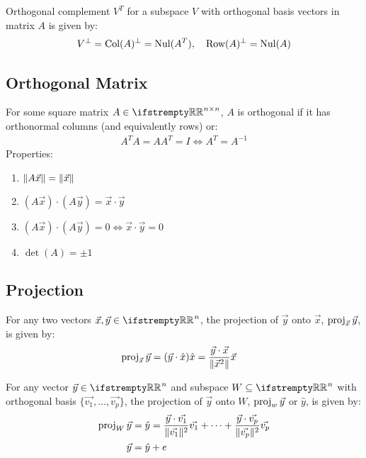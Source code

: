 \documentclass[12pt, a4paper]{article}
\begin{document}
\begin{multicols*}{3}
Orthogonal complement $V^T$ for a subspace $V$ with orthogonal basis vectors in matrix $A$ is given by:
\begin{align*}
  V^{\perp} = \operatorname{Col}(A)^{\perp} = \operatorname{Nul}(A^T),\quad \operatorname{Row}(A)^{\perp} = \operatorname{Nul}(A)
\end{align*}

\subsection{Orthogonal Matrix}
For some square matrix $A \in \RR^{n{\times}n}$, $A$ is orthogonal if it has orthonormal columns (and equivalently rows) or:
\begin{align*}
  A^TA = AA^T = I \iff A^T = A^{-1}
\end{align*}
Properties:
\begin{enumerate}[\roman*.]
  \item $\lVert A\vec{x}\rVert = \lVert\vec{x}\rVert$
  \item $(A\vec{x})\cdot(A\vec{y}) = \vec{x}\cdot\vec{y}$
  \item $(A\vec{x})\cdot(A\vec{y}) = 0 \iff \vec{x}\cdot\vec{y} = 0$
  \item $\det(A) = \pm 1 $
\end{enumerate}

\colbreak

\subsection{Projection}
For any two vectors $\vec{x}, \vec{y} \in \RR^n$, the projection of $\vec{y}$ onto $\vec{x}$, $\operatorname{proj}_{\vec{x}}\vec{y}$, is given by:
\begin{align*}
  \operatorname{proj}_{\vec{x}}\vec{y} &= (\vec{y}\cdot\hat{x})\hat{x} = \frac{\vec{y}\cdot\vec{x}}{\lVert\vec{x}^2\rVert}\vec{x}
\end{align*}

For any vector $\vec{y} \in \RR^n$ and subspace $W \subseteq \RR^n$ with orthogonal basis $\{\vec{v_1},\ldots,\vec{v_p}\}$, the projection of $\vec{y}$ onto $W$, $\operatorname{proj}_w\vec{y}$ or $\hat{y}$, is given by:
\begin{align*}
  \operatorname{proj}_W\vec{y} &= \hat{y} = \frac{\vec{y}\cdot\vec{v_1}}{\lVert\vec{v_1}\rVert^2}\vec{v_1} + \cdots +  \frac{\vec{y}\cdot\vec{v_p}}{\lVert\vec{v_p}\rVert^2}\vec{v_p}\\ 
  \vec{y} &= \hat{y} + e
\end{align*}


\end{multicols*}
\end{document}
